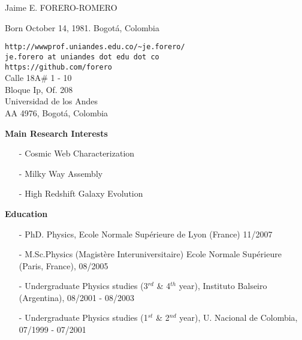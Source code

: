 \documentclass[letterpaper,11pt,onecolumn]{article}
\begin{document}
\noindent

\noindent
{{\Large Jaime E. FORERO-ROMERO}}\\
\begin{flushleft}
Born October 14, 1981. Bogot\'a, Colombia\\
\end{flushleft}
\begin{flushright}
\verb"http://wwwprof.uniandes.edu.co/~je.forero/" \\{\tt{je.forero at uniandes dot edu dot co}}\\
\verb"https://github.com/forero"\\
Calle 18A\# 1 - 10\\
Bloque Ip, Of. 208\\
Universidad de los Andes\\
AA 4976, Bogot\'a, Colombia\\
\end{flushright}


{\bf Main Research Interests}
\begin{itemize}
\item[-]{Cosmic Web Characterization}
\item[-]{Milky Way Assembly}
\item[-]{High Redshift Galaxy Evolution}
\end{itemize}

{\bf Education}
\indent
\begin{itemize}
\item[-] PhD. Physics, Ecole Normale Sup\'erieure de Lyon (France) 11/2007
\item[-] M.Sc.Physics (Magist\`ere Interuniversitaire)  Ecole Normale
  Sup\'erieure (Paris, France), 08/2005
\item[-] Undergraduate Physics studies (3$^{rd}$ \& 4$^{th}$ year),
  Instituto Balseiro (Argentina), 08/2001 - 08/2003
\item[-] Undergraduate Physics studies (1$^{st}$ \& 2$^{nd}$ year),
  U. Nacional de Colombia, 07/1999 -  07/2001
\end{itemize}
\end{document}
